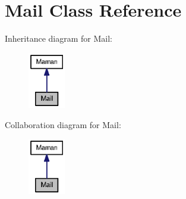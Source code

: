\hypertarget{classMail}{
\section{Mail Class Reference}
\label{classMail}
}
Inheritance diagram for Mail:\nopagebreak
\begin{figure}[H]
\begin{center}
\leavevmode
\includegraphics[width=46pt]{classMail__inherit__graph}
\end{center}
\end{figure}
Collaboration diagram for Mail:\nopagebreak
\begin{figure}[H]
\begin{center}
\leavevmode
\includegraphics[width=46pt]{classMail__coll__graph}
\end{center}
\end{figure}
